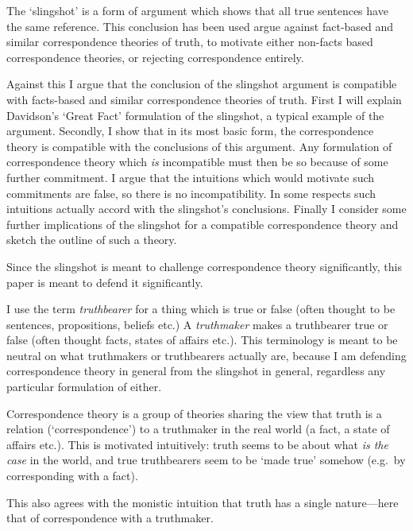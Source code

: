 The `slingshot' is a form of argument which shows that all true sentences have the same reference.
This conclusion has been used argue against fact-based and similar correspondence theories of truth, to motivate either non-facts based correspondence theories, or rejecting correspondence entirely.

Against this I argue that the conclusion of the slingshot argument is compatible with facts-based and similar correspondence theories of truth.
First I will explain Davidson's `Great Fact' formulation of the slingshot, a typical example of the argument.
Secondly, I show that in its most basic form, the correspondence theory is compatible with the conclusions of this argument.
Any formulation of correspondence theory which \emph{is} incompatible must then be so because of some further commitment.
I argue that the intuitions which would motivate such commitments are false, so there is no incompatibility.
In some respects such intuitions actually accord with the slingshot's conclusions.
Finally I consider some further implications of the slingshot for a compatible correspondence theory and sketch the outline of such a theory.

Since the slingshot is meant to challenge correspondence theory significantly, this paper is meant to defend it significantly.

I use the term \textit{truthbearer} for a thing which is true or false (often thought to be sentences, propositions, beliefs etc.)
A \textit{truthmaker} makes a truthbearer true or false (often thought facts, states of affairs etc.).
This terminology is meant to be neutral on what truthmakers or truthbearers actually are, because I am defending correspondence theory in general from the slingshot in general, regardless any particular formulation of either.

Correspondence theory is a group of theories sharing the view that truth is a relation (`correspondence') to a truthmaker in the real world (a fact, a state of affairs etc.).
This is motivated intuitively: truth seems to be about what \emph{is the case} in the world, and true truthbearers seem to be `made true' somehow (e.g.\ by corresponding with a fact).

This also agrees with the monistic intuition that truth has a single nature---here that of correspondence with a truthmaker.

